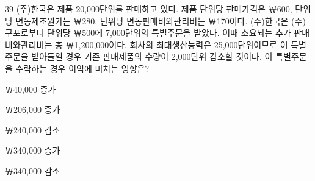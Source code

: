 \begin{question}{39}
(주)한국은 제품 20,000단위를 판매하고 있다. 제품 단위당 판매가격은 ￦600, 단위당 변동제조원가는 ￦280, 단위당 변동판매비와관리비는 ￦170이다. (주)한국은 (주)구포로부터 단위당 ￦500에 7,000단위의 특별주문을 받았다. 이때 소요되는 추가 판매비와관리비는 총 ￦1,200,000이다. 회사의 최대생산능력은 25,000단위이므로 이 특별주문을 받아들일 경우 기존 판매제품의 수량이 2,000단위 감소할 것이다. 이 특별주문을 수락하는 경우 이익에 미치는 영향은?
\begin{choices}
  \item ￦40,000 증가
  \item ￦206,000 증가
  \item ￦240,000 감소
  \item ￦340,000 증가
  \item ￦340,000 감소
\end{choices}
\end{question}
